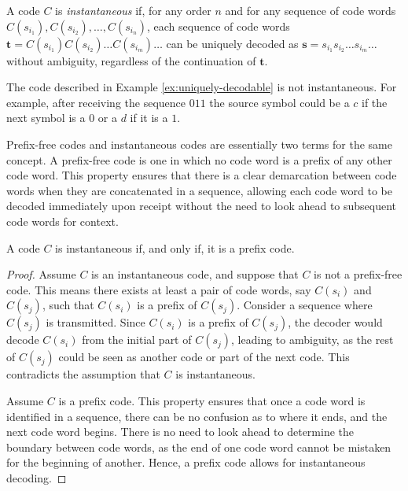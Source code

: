 \begin{definition}
A code $C$ is \emph{instantaneous} if, for any order $n$ and for any sequence of code words $C(s_{i_1}), C(s_{i_2}), \ldots, C(s_{i_n})$, each sequence of code words $\mathbf{t} = C(s_{i_1})C(s_{i_2})\ldots C(s_{i_m})\ldots$ can be uniquely decoded as $\mathbf{s} = s_{i_1}s_{i_2}\ldots s_{i_m}\ldots$ without ambiguity, regardless of the continuation of $\mathbf{t}$.
\end{definition}

\begin{example}
The code described in Example \ref{ex:uniquely-decodable} is not instantaneous. For example, after receiving the sequence $011$ the source symbol could be a $c$ if the next symbol is a $0$ or a $d$ if it is a $1$.
\end{example}

Prefix-free codes and instantaneous codes are essentially two terms for the same concept. A prefix-free code is one in which no code word is a prefix of any other code word. This property ensures that there is a clear demarcation between code words when they are concatenated in a sequence, allowing each code word to be decoded immediately upon receipt without the need to look ahead to subsequent code words for context.

\begin{proposition}
A code $C$ is instantaneous if, and only if, it is a prefix code.
\end{proposition}
\begin{proof}
Assume $C$ is an instantaneous code, and suppose that $C$ is not a prefix-free code. This means there exists at least a pair of code words, say $C(s_i)$ and $C(s_j)$, such that $C(s_i)$ is a prefix of $C(s_j)$. Consider a sequence where $C(s_j)$ is transmitted. Since $C(s_i)$ is a prefix of $C(s_j)$, the decoder would decode $C(s_i)$ from the initial part of $C(s_j)$, leading to ambiguity, as the rest of $C(s_j)$ could be seen as another code or part of the next code. This contradicts the assumption that $C$ is instantaneous.

Assume $C$ is a prefix code. This property ensures that once a code word is identified in a sequence, there can be no confusion as to where it ends, and the next code word begins. There is no need to look ahead to determine the boundary between code words, as the end of one code word cannot be mistaken for the beginning of another. Hence, a prefix code allows for instantaneous decoding.
\end{proof}

